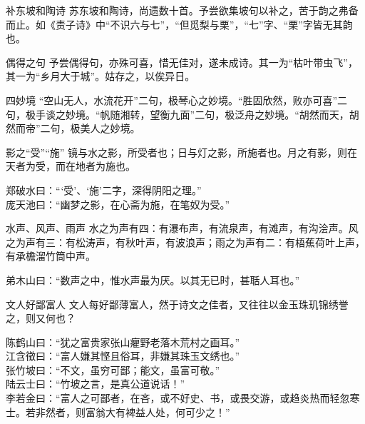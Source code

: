 \begin{yulu}{补东坡和陶诗}
苏东坡和陶诗，尚遗数十首。予尝欲集坡句以补之，苦于韵之弗备而止。如《责子诗》中“不识六与七”，“但觅梨与栗”，“七”字、“栗”字皆无其韵也。
\begin{comments}

\end{comments}
\end{yulu}

\begin{yulu}{偶得之句}
予尝偶得句，亦殊可喜，惜无佳对，遂未成诗。其一为“枯叶带虫飞”，其一为“乡月大于城”。姑存之，以俟异日。
\begin{comments}

\end{comments}
\end{yulu}

\begin{yulu}{四妙境}
“空山无人，水流花开”二句，极琴心之妙境。“胜固欣然，败亦可喜”二句，极手谈之妙境。“帆随湘转，望衡九面”二句，极泛舟之妙境。“胡然而天，胡然而帝”二句，极美人之妙境。
\begin{comments}

\end{comments}
\end{yulu}

\begin{yulu}{影之“受”“施”}
镜与水之影，所受者也；日与灯之影，所施者也。月之有影，则在天者为受，而在地者为施也。
\begin{comments}
郑破水曰：“‘受’、‘施’二字，深得阴阳之理。” \\
庞天池曰：“幽梦之影，在心斋为施，在笔奴为受。”
\end{comments}
\end{yulu}

\begin{yulu}{水声、风声、雨声}
水之为声有四：有瀑布声，有流泉声，有滩声，有沟浍声。风之为声有三：有松涛声，有秋叶声，有波浪声；雨之为声有二：有梧蕉荷叶上声，有承檐溜竹筒中声。
\begin{comments}
弟木山曰：“数声之中，惟水声最为厌。以其无已时，甚聒人耳也。”
\end{comments}
\end{yulu}

\begin{yulu}{文人好鄙富人}
文人每好鄙薄富人，然于诗文之佳者，又往往以金玉珠玑锦绣誉之，则又何也？
\begin{comments}
陈鹤山曰：“犹之富贵家张山癯野老落木荒村之画耳。” \\
江含徵曰：“富人嫌其悭且俗耳，非嫌其珠玉文绣也。” \\
张竹坡曰：“不文，虽穷可鄙；能文，虽富可敬。” \\
陆云士曰：“竹坡之言，是真公道说话！” \\
李若金曰：“富人之可鄙者，在吝，或不好史、书，或畏交游，或趋炎热而轻忽寒士。若非然者，则富翁大有裨益人处，何可少之！”
\end{comments}
\end{yulu}

